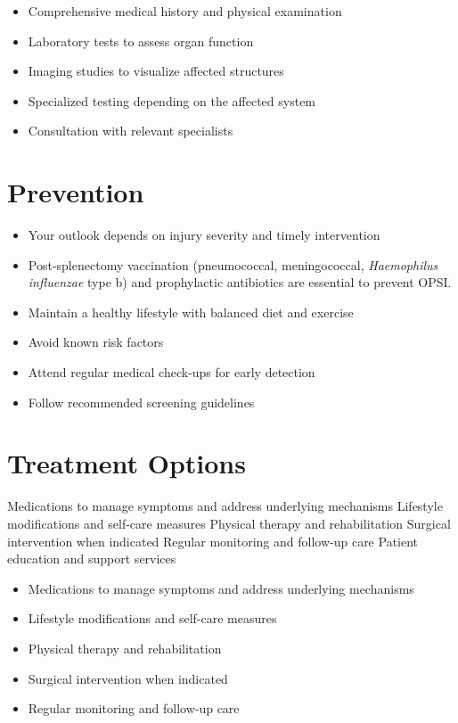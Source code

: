 \begin{itemize}[noitemsep]
  \item Comprehensive medical history and physical examination
  \item Laboratory tests to assess organ function
  \item Imaging studies to visualize affected structures
  \item Specialized testing depending on the affected system
  \item Consultation with relevant specialists
\end{itemize}
\section{Prevention}
\begin{itemize}[noitemsep]
  \item Your outlook depends on injury severity and timely intervention
  \item Post-splenectomy vaccination (pneumococcal, meningococcal, \textit{Haemophilus influenzae} type b) and prophylactic antibiotics are essential to prevent OPSI.
  \item Maintain a healthy lifestyle with balanced diet and exercise
  \item Avoid known risk factors
  \item Attend regular medical check-ups for early detection
  \item Follow recommended screening guidelines
\end{itemize}
\section{Treatment Options}
Medications to manage symptoms and address underlying mechanisms Lifestyle modifications and self-care measures Physical therapy and rehabilitation Surgical intervention when indicated Regular monitoring and follow-up care Patient education and support services

\begin{itemize}[noitemsep]
  \item Medications to manage symptoms and address underlying mechanisms
  \item Lifestyle modifications and self-care measures
  \item Physical therapy and rehabilitation
  \item Surgical intervention when indicated
  \item Regular monitoring and follow-up care
\end{itemize}
